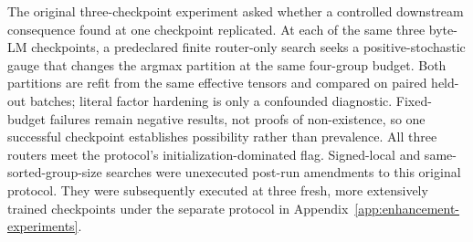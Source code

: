 The original three-checkpoint experiment asked whether a controlled
downstream consequence found at one checkpoint replicated.  At each of the same three byte-LM
checkpoints, a
predeclared finite router-only search seeks a positive-stochastic gauge that
changes the argmax partition at the same four-group budget.  Both partitions
are refit from the same effective tensors and compared on paired held-out
batches; literal factor hardening is only a confounded diagnostic.  Fixed-budget
failures remain negative results, not proofs of non-existence, so one successful
checkpoint establishes possibility rather than prevalence.  All three routers
meet the protocol's initialization-dominated flag.  Signed-local and same-sorted-group-size searches were unexecuted
post-run amendments to this original protocol. They were subsequently
executed at three fresh, more extensively trained checkpoints under the
separate protocol in Appendix~\ref{app:enhancement-experiments}.
